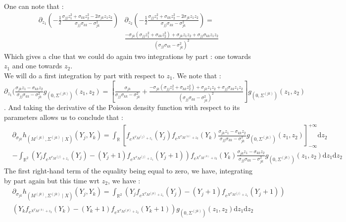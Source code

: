 \documentclass[11pt, a4paper]{article}
\begin{document}
One can note that :
\begin{align*}
\partial_{z_1} ( - \frac{1}{2} \frac{\sigma_{jj} z_1^2 + \sigma_{kk} z_2^2 - 2 \sigma_{jk} z_1 z_2 }{\sigma_{jj} \sigma_{kk}-  \sigma_{jk}^2} ) & \partial_{z_2} ( - \frac{1}{2} \frac{\sigma_{jj} z_1^2 + \sigma_{kk} z_2^2 - 2 \sigma_{jk} z_1 z_2 }{\sigma_{jj} \sigma_{kk}-  \sigma_{jk}^2} ) =\\
&  \frac{-\sigma_{jk} ( \sigma_{jj} z_1^2 + \sigma_{kk} z_2^2 ) + \sigma_{jk} z_1 z_2 + \sigma_{jj} \sigma_{kk} z_1 z_2}{(\sigma_{jj} \sigma_{kk} - \sigma_{jk}^2)^2}
\end{align*}
Which gives a clue that we could do again two integrations by part : one towards $z_1$ and one towards $z_2$. \\
We will do a first integration by part with respect to $z_1$. We note that : $ \partial_{z_1} ( \frac{\sigma_{jk}z_1-\sigma_{kk}z_2}{\sigma_{jj} \sigma_{kk}- \sigma_{jk}^2} g_{(0,\Sigma^{(jk)})}(z_1,z_2) = [\frac{\sigma_{jk}}{\sigma_{jj} \sigma_{kk} - \sigma_{jk}^2} + \frac{-\sigma_{jk} ( \sigma_{jj} z_1^2 + \sigma_{kk} z_2^2 ) + \sigma_{jk} z_1 z_2 + \sigma_{jj} \sigma_{kk} z_1 z_2}{(\sigma_{jj} \sigma_{kk} - \sigma_{jk}^2)^2}] g_{(0,\Sigma^{(jk)})}(z_1,z_2)$. And taking the derivative of the Poisson density function with respect to its parameters allows us to conclude that :
\begin{align*}
&\partial_{\sigma_{jk}}h_{(M^{(jk)},\Sigma^{(jk)} \mid X)}(Y_j,Y_k) = \int_{\mathbb{R}} [ f_{e^{X^T M^{(j)}+z_1}}(Y_j) f_{e^{X^T M^{(k)}+z_2}}(Y_k) \frac{\sigma_{jk}z_1-\sigma_{kk}z_2}{\sigma_{jj} \sigma_{kk}- \sigma_{jk}^2} g_{(0,\Sigma^{(jk)})}(z_1,z_2)]_{- \infty}^{+ \infty} \mathrm{d}z_2\\
& - \int_{\mathbb{R}^2} (Y_j f_{e^{X^T M^{(j)}+z_1}}(Y_j)- (Y_j+1) f_{e^{X^T M^{(j)}+z_1}}(Y_j+1)) f_{e^{X^T M^{(k)}+z_2}}(Y_k) \frac{\sigma_{jk} z_1 - \sigma_{kk} z_2}{\sigma_{jj} \sigma_{kk} - \sigma_{jk}^2} g_{(0,\Sigma^{(jk)})}(z_1,z_2) \mathrm{d}z_1  \mathrm{d}z_2
\end{align*}
The first right-hand term of the equality being equal to zero, we have, integrating by part again but this time wrt $z_2$, we have :
\begin{align*}
&\partial_{\sigma_{jk}}h_{(M^{(jk)},\Sigma^{(jk)} \mid X)}(Y_j,Y_k) =\int_{\mathbb{R}^2} (Y_j f_{e^{X^T M^{(jk)}+z_1}}(Y_j)- (Y_j+1) f_{e^{X^T M^{(j)}+z_1}}(Y_j+1))\\
& (Y_k f_{e^{X^T M^{(k)}+z_2}}(Y_k)-(Y_k + 1) f_{e^{X^T M^{(jk)}+z_2}}(Y_k+1))  g_{(0,\Sigma^{(jk)})}(z_1,z_2) \mathrm{d}z_1  \mathrm{d}z_2
\end{align*}
\end{document}
